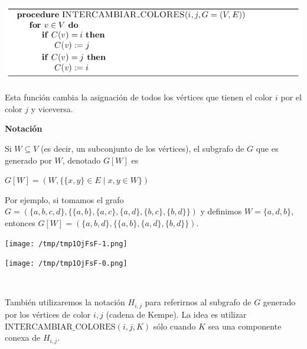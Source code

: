 \documentclass[10pt,a4paper]{article}
\begin{document}
    \begin{adjustbox}{max size={\textwidth}{\textheight}}
        \includegraphics{definitions/alg_interc.png}
        \end{adjustbox}
    

Esta función cambia la asignación de todos los vértices que tienen el color $i$ por el color $j$ y viceversa.

\textbf{Notación}

Si $W \subseteq V$ (es decir, un subconjunto de los vértices), el subgrafo de $G$ que es generado por $W$, denotado $G[W]$ es

\begin{center}
$G[W] = (W, \{\{x, y\} \in E \mid x, y \in W\})$
\end{center}

Por ejemplo, si tomamos el grafo $G = (\{a, b, c, d\}, \{\{a, b\},\{a, c\},\{a, d\},\{b,c\}, \{b, d\}\})$ y definimos $W = \{a, d, b\}$, entonces $G[W] = (\{a, b, d\}, \{\{a, b\},\{a, d\}, \{b, d\}\})$.

\begin{center}

    \begin{adjustbox}{max size={\textwidth}{\textheight}}
        \texttt{[image: /tmp/tmp1OjFsF-1.png]}
        \end{adjustbox}
    
    \begin{adjustbox}{max size={\textwidth}{\textheight}}
        \texttt{[image: /tmp/tmp1OjFsF-0.png]}
        \end{adjustbox}
    
\end{center}

\begin{center}
 
\end{center}

También utilizaremos la notación $H_{i, j}$ para referirnos al subgrafo de $G$ generado por los vértices de color $i, j$ (cadena de Kempe). La idea es utilizar $\text{INTERCAMBIAR_COLORES}(i, j, K)$ sólo cuando $K$ sea una componente conexa de $H_{i,j}$.

 
\end{document}
